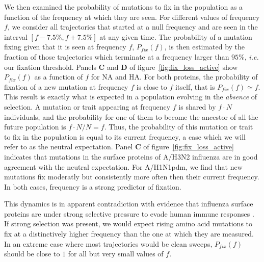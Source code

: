 \documentclass[reprint,amsmath,amssymb,superscriptaddress,showpacs,rmp]{revtex4-1}
\begin{document}
We then examined the probability of mutations to fix in the population as a function of the frequency at which they are seen.
For different values of frequency $f$, we consider all trajectories that started at a null frequency and are seen in the interval $[f - 7.5\%, f + 7.5\%]$ at any given time.
The probability of a mutation fixing given that it is seen at frequency $f$, $P_{fix}(f)$, is then estimated by the fraction of those trajectories which terminate at a frequency larger than $95\%$, \emph{i.e.} our fixation threshold.
Panels \textbf{C} and \textbf{D} of figure~\ref{fig:fix_loss_active} show $P_{fix}(f)$ as a function of $f$ for NA and HA.
For both proteins, the probability of fixation of a new mutation at frequency $f$ is close to $f$ itself, that is $P_{fix}(f)\simeq f$.
This result is exactly what is expected in a population evolving in the \emph{absence} of selection.
A mutation or trait appearing at frequency $f$ is shared by $f\cdot N$ individuals, and the probability for one of them to become the ancestor of all the future population is $f\cdot N/N=f$.
Thus, the probability of this mutation or trait to fix in the population is equal to its current frequency, a case which we will refer to as the neutral expectation.
Panel \textbf{C} of figure~\ref{fig:fix_loss_active} indicates that mutations in the surface proteins of A/H3N2 influenza are in good agreement with the neutral expectation.
For A/H1N1pdm, we find that new mutations fix moderatly but consistently more often then their current frequency.
In both cases, frequency is a strong predictor of fixation.

This dynamics is in apparent contradiction with evidence that influenza surface proteins are under strong selective pressure to evade human immune responses \citep{bhatt_genomic_2011}.
If strong selection was present, we would expect rising amino acid mutations to fix at a distinctively higher frequency than the one at which they are measured.
In an extreme case where most trajectories would be clean sweeps, $P_{fix}(f)$ should be close to $1$ for all but very small values of $f$.
\end{document}
